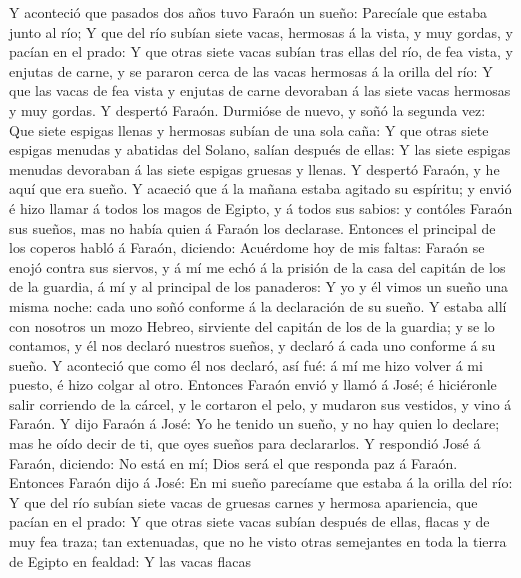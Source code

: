 Y aconteció que pasados dos años tuvo Faraón un sueño:
Parecíale que estaba junto al río;  Y que del río subían
siete vacas, hermosas á la vista, y muy gordas, y pacían en el prado:
 Y que otras siete vacas subían tras ellas del río, de fea
vista, y enjutas de carne, y se pararon cerca de las vacas hermosas á la
orilla del río:  Y que las vacas de fea vista y enjutas de
carne devoraban á las siete vacas hermosas y muy gordas. Y despertó
Faraón.  Durmióse de nuevo, y soñó la segunda vez: Que
siete espigas llenas y hermosas subían de una sola caña: 
Y que otras siete espigas menudas y abatidas del Solano, salían después
de ellas:  Y las siete espigas menudas devoraban á las
siete espigas gruesas y llenas. Y despertó Faraón, y he aquí que era
sueño.  Y acaeció que á la mañana estaba agitado su
espíritu; y envió é hizo llamar á todos los magos de Egipto, y á todos
sus sabios: y contóles Faraón sus sueños, mas no había quien á Faraón
los declarase.  Entonces el principal de los coperos habló
á Faraón, diciendo: Acuérdome hoy de mis faltas:  Faraón
se enojó contra sus siervos, y á mí me echó á la prisión de la casa del
capitán de los de la guardia, á mí y al principal de los panaderos:
 Y yo y él vimos un sueño una misma noche: cada uno soñó
conforme á la declaración de su sueño.  Y estaba allí con
nosotros un mozo Hebreo, sirviente del capitán de los de la guardia; y
se lo contamos, y él nos declaró nuestros sueños, y declaró á cada uno
conforme á su sueño.  Y aconteció que como él nos
declaró, así fué: á mí me hizo volver á mi puesto, é hizo colgar al
otro.  Entonces Faraón envió y llamó á José; é hiciéronle
salir corriendo de la cárcel, y le cortaron el pelo, y mudaron sus
vestidos, y vino á Faraón.  Y dijo Faraón á José: Yo he
tenido un sueño, y no hay quien lo declare; mas he oído decir de ti, que
oyes sueños para declararlos.  Y respondió José á Faraón,
diciendo: No está en mí; Dios será el que responda paz á Faraón.
 Entonces Faraón dijo á José: En mi sueño parecíame que
estaba á la orilla del río:  Y que del río subían siete
vacas de gruesas carnes y hermosa apariencia, que pacían en el prado:
 Y que otras siete vacas subían después de ellas, flacas
y de muy fea traza; tan extenuadas, que no he visto otras semejantes en
toda la tierra de Egipto en fealdad:  Y las vacas flacas
